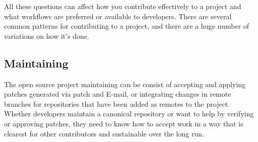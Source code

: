 \documentclass[draftclsnofoot,journal,onecolumn,12pt]{IEEEtran}
\begin{document}
All these questions can affect how you contribute effectively to a project and what workflows are preferred or available to developers. There are several common patterns for contributing to a project, and there are a huge number of variations on how it’s done.
\subsection{Maintaining}
The open source project maintaining can be consist of accepting and applying patches generated via patch and E-mail, or integrating changes in remote branches for repositories that have been added as remotes to the project. Whether developers maintain a canonical repository or want to help by verifying or approving patches, they need to know how to accept work in a way that is clearest for other contributors and sustainable over the long run.
\end{document}
